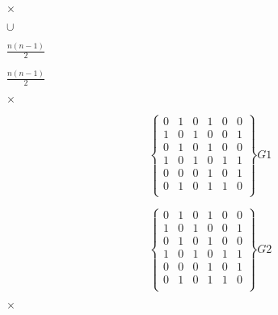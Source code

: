 \documentclass[10pt]{book}
\begin{document}
\begin{mdSnippets}
\begin{mdInlineSnippet}[60c13e05d3ec8c10b8564eae7023d9db]
$\times$\end{mdInlineSnippet}%
\begin{mdInlineSnippet}[1a4d3aa5781ebd50a8104d20b287ac85]%
$\cup$\end{mdInlineSnippet}%
\begin{mdInlineSnippet}%
$\frac{n ( n - 1 )}{2}$\end{mdInlineSnippet}%
\begin{mdInlineSnippet}%
$\frac{n ( n - 1 )}{2}$\end{mdInlineSnippet}%
\begin{mdInlineSnippet}[60c13e05d3ec8c10b8564eae7023d9db]%
$\times$\end{mdInlineSnippet}%
\begin{mdDisplaySnippet}[460e9e6774642e63b27d1fe59687843d]%
\[ \left\{
 \begin{matrix}
   0 & 1 & 0 & 1 & 0 & 0\\
   1 & 0 & 1 & 0 & 0 & 1\\
   0 & 1 & 0 & 1 & 0 & 0\\
   1 & 0 & 1 & 0 & 1 & 1\\
   0 & 0 & 0 & 1 & 0 & 1\\
   0 & 1 & 0 & 1 & 1 & 0\\
  \end{matrix}
  \right\}   G1
\]%
\end{mdDisplaySnippet}%
\begin{mdDisplaySnippet}%
\[ \left\{
 \begin{matrix}
   0 & 1 & 0 & 1 & 0 & 0\\
   1 & 0 & 1 & 0 & 0 & 1\\
   0 & 1 & 0 & 1 & 0 & 0\\
   1 & 0 & 1 & 0 & 1 & 1\\
   0 & 0 & 0 & 1 & 0 & 1\\
   0 & 1 & 0 & 1 & 1 & 0\\
  \end{matrix}
  \right\}   G2
\]%
\end{mdDisplaySnippet}%
\begin{mdInlineSnippet}[60c13e05d3ec8c10b8564eae7023d9db]%
$\times$\end{mdInlineSnippet}%
\begin{mdInlineSnippet}[60c13e05d3ec8c10b8564eae7023d9db]%

\end{mdInlineSnippet}
\end{mdSnippets}
\end{document}
